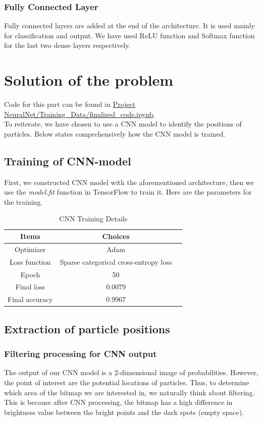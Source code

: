 \documentclass[11pt,a4paper]{scrartcl}
\begin{document}
\subsubsection{Fully Connected Layer}
Fully connected layers are added at the end of the architecture. It is used mainly for classification and output. We have used ReLU function and Softmax function for the last two dense layers respectively.
\newpage

\section{Solution of the problem}

Code for this part can be found in \url{Project NeuralNet/Training_Data/finalized_code.ipynb}.\\

To reiterate, we have chosen to use a CNN model to identify the positions of particles. Below states comprehensively how the CNN model is trained.

\subsection{Training of CNN-model}
First, we constructed CNN model with the aforementioned architecture, then we use the \textit{model.fit} function in TensorFlow to train it. Here are the parameters for the training.
\begin{table}[h]
\centering
\begin{tabular}{ccc}
\toprule
\textbf{Items} & \textbf{Choices}  \\
\midrule
Optimizer & Adam \\
Loss function & Sparse categorical cross-entropy loss  \\
Epoch & 50 \\
Final loss & 0.0079  \\
Final accuracy & 0.9967  \\
\bottomrule
\end{tabular}
\caption{CNN Training Details}
\end{table}

\subsection{Extraction of particle positions}

\subsubsection{Filtering processing for CNN output}
The output of our CNN model is a 2-dimensional image of probabilities. However, the point of interest are the potential locations of particles. Thus, to determine which area of the bitmap we are interested in, we naturally think about filtering. This is because after CNN processing, the bitmap has a high difference in brightness value between the bright points and the dark spots (empty space). \\
\end{document}
